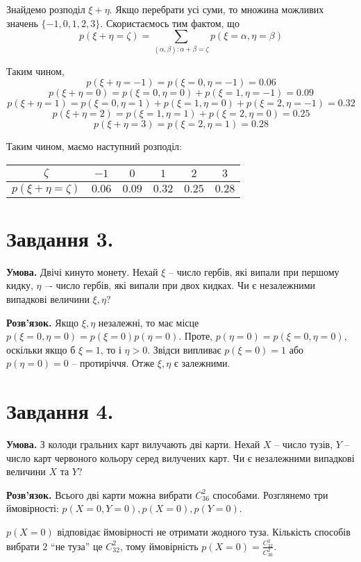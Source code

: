 \documentclass[14pt]{extarticle}
\begin{document}
Знайдемо розподіл $\xi+\eta$. Якщо перебрати усі суми, то множина можливих значень $\{-1,0,1,2,3\}$. Скористаємось тим фактом, що
\[
p(\xi+\eta=\zeta) = \sum_{(\alpha,\beta):\alpha+\beta=\zeta} p(\xi=\alpha,\eta=\beta)
\]

Таким чином,
\[
p(\xi+\eta=-1)=p(\xi=0,\eta=-1)=0.06
\]
\[
p(\xi+\eta=0)=p(\xi=0,\eta=0)+p(\xi=1,\eta=-1)=0.09
\]
\[
p(\xi+\eta=1)=p(\xi=0,\eta=1)+p(\xi=1,\eta=0)+p(\xi=2,\eta=-1)=0.32
\]
\[
p(\xi+\eta=2)=p(\xi=1,\eta=1)+p(\xi=2,\eta=0)=0.25
\]
\[
p(\xi+\eta=3)=p(\xi=2,\eta=1)=0.28
\]

Таким чином, маємо наступний розподіл:

\begin{center}
\begin{tabular}{ |c|c|c|c|c|c| } 
 \hline
 $\zeta$ & $-1$ & $0$ & $1$ & $2$ & $3$ \\ 
 \hline
 $p(\xi+\eta=\zeta)$ & $0.06$ & $0.09$ & $0.32$ & $0.25$ & $0.28$\\ 
 \hline
\end{tabular}
\end{center}
\pagebreak

\section*{Завдання 3.}

\textbf{Умова.} Двічі кинуто монету. Нехай $\xi$ -- число гербів, які випали при першому кидку,
$\eta$ –- число гербів, які випали при двох кидках. Чи є незалежними випадкові величини $\xi,\eta$?

\textbf{Розв'язок.} Якщо $\xi,\eta$ незалежні, то має місце $p(\xi=0,\eta=0) = p(\xi=0)p(\eta=0)$. Проте, $p(\eta=0)=p(\xi=0,\eta=0)$, оскільки якщо б $\xi=1$, то і $\eta>0$. Звідси випливає $p(\xi=0)=1$ або $p(\eta=0)=0$ -- протиріччя. Отже $\xi,\eta$ є залежними. 

\section*{Завдання 4.}

\textbf{Умова.} З колоди гральних карт вилучають дві карти. Нехай $X$ -- число тузів, $Y$ -- число
карт червоного кольору серед вилучених карт. Чи є незалежними випадкові величини $X$ та $Y$?

\textbf{Розв'язок.} Всього дві карти можна вибрати $C_{36}^2$ способами. Розглянемо три ймовірності: $p(X=0,Y=0), p(X=0),p(Y=0)$. 

$p(X=0)$ відповідає ймовірності не отримати жодного туза. Кількість способів вибрати $2$ ``не туза'' це $C_{32}^2$, тому ймовірність $p(X=0)=\frac{C_{32}^2}{C_{36}^2}$.
\end{document}
